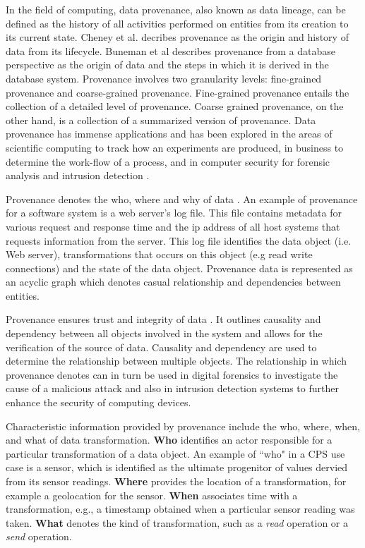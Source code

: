 In the field of computing, data provenance, also known as  data lineage, can be defined as the history of all activities performed on entities from its creation to its current state. Cheney et al. \cite{cheney_provenance_2009} decribes provenance as the origin and history of data from its lifecycle. Buneman et al \cite{buneman_why_2001} describes provenance from a database perspective as the origin of data and the steps in which it is derived in the database system.  Provenance involves two granularity levels: fine-grained provenance and coarse-grained provenance. Fine-grained provenance \cite{glavic_case_2011} entails the collection of a detailed level of provenance. Coarse grained provenance, on the other hand, is a collection of a summarized version of provenance. Data provenance has immense applications and has been explored in the areas of scientific computing \cite{groth, altintas} to track how an experiments are produced, in business to determine the work-flow of  a process, and in computer security for forensic analysis and intrusion detection \cite{bates_towards_2013, muniswamy_reddy_provenance_2010, muniswamy_reddy} . 


Provenance denotes the who, where and why of data \cite{cheney_provenance_2009}. An example of provenance for a software system is a web server's log file. This file contains metadata for various request and response time and the ip address of all host systems that requests information from the server. This log file identifies the data object (i.e. Web server), transformations that occurs on this object (e.g read write connections) and the state of the data object. Provenance data is represented as an acyclic graph which denotes casual relationship and dependencies between entities. 

\par Provenance ensures trust and integrity of data \cite{Bertino2015}. It outlines causality and dependency between all objects involved in the system and allows for the verification of the source of data. Causality and dependency are used to determine the relationship between multiple objects. The relationship in which provenance denotes can in turn be used in digital forensics \cite{zawoadfecloud} to investigate the cause of a malicious attack and also in intrusion detection systems to further enhance the security of computing devices. 
 

Characteristic information provided by provenance include the who, where, when, and what of data transformation. \textbf{Who} identifies an actor responsible for a particular transformation of a data object. An example of ``who" in a CPS use case is a sensor, which is identified as the ultimate progenitor of values dervied from its sensor readings. \textbf{Where} provides the location of a transformation, for example a geolocation for the sensor. \textbf{When} associates time with a transformation, e.g., a timestamp obtained when a particular sensor reading was taken. \textbf{What} denotes the kind of transformation, such as a {\em read} operation or a {\em send} operation.

